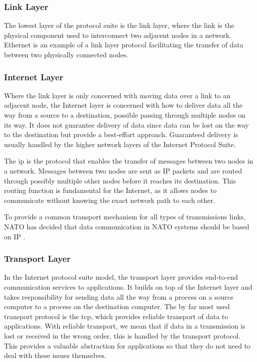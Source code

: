 \subsubsection{Link Layer}

The lowest layer of the protocol suite is the link layer, where the link is the
physical component used to interconnect two adjacent nodes in a network.
Ethernet is an example of a link layer protocol facilitating the transfer of
data between two physically connected nodes.

\subsubsection{Internet Layer}

 Where the link layer is only concerned with moving data over a link to an
 adjacent node, the Internet layer is concerned with how to deliver data all the
 way from a source to a destination, possible passing through multiple nodes on
 its way. It does not guarantee delivery of data since data can be lost on the
 way to the destination but provide a best-effort approach. Guaranteed delivery is
 usually handled by the higher network layers of the Internet Protocol Suite.

 The \gls{ip} is the protocol that enables the transfer of messages between two
 nodes in a network. Messages between two nodes are sent as IP packets and are
 routed through possibly multiple other nodes before it reaches its destination.
 This routing function is fundamental for the Internet, as it allows nodes to
 communicate without knowing the exact network path to each other.

To provide a common transport mechanism for all types of transmissions links,
NATO has decided that data communication in NATO systems should be based on IP
\cite{nnec-study}.


 \subsubsection{Transport Layer}

In the Internet protocol suite model, the transport layer provides end-to-end
communication services to applications. It builds on top of the Internet layer
and takes responsibility for sending data all the way from a process on a source
computer to a process on the destination computer. The by far most used
transport protocol is the \gls{tcp}, which provides reliable transport of data
to applications. With reliable transport, we mean that if data in a transmission
is lost or received in the wrong order, this is handled by the transport
protocol. This provides a valuable abstraction for applications so that they do
not need to deal with these issues themselves.

